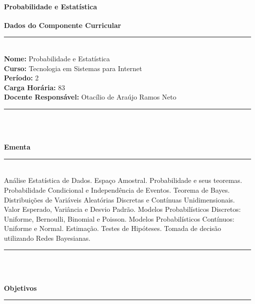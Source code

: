 \paragraph{Probabilidade e Estatística}

\begin{center}\textbf{Dados do Componente Curricular}\end{center}
\vspace{-5mm}
\noindent\rule{16.5cm}{0.4pt}
\\
\textbf{Nome:} Probabilidade e Estatística
\\ 
\textbf{Curso:} Tecnologia em Sistemas para Internet
\\ 
\textbf{Período:} \unit{2}{\degree}
\\ 
\textbf{Carga Horária:} \unit{83}{\hour}
\\ 
\textbf{Docente Responsável:} Otacílio de Araújo Ramos Neto
\\ 
\noindent\rule{16.5cm}{0.4pt}\\
\\
\vspace{-12mm}
\begin{center}\textbf{Ementa}\end{center}
\vspace{-5mm}
\noindent\rule{16.5cm}{0.4pt}
\\
Análise Estatística de Dados. Espaço Amostral. Probabilidade e seus teoremas. Probabilidade Condicional e Independência de Eventos. Teorema de Bayes. Distribuições de Variáveis Aleatórias Discretas e Contínuas Unidimensionais. Valor Esperado, Variância e Desvio Padrão. Modelos Probabilísticos Discretos: Uniforme, Bernoulli, Binomial e Poisson. Modelos Probabilísticos Contínuos: Uniforme e Normal. Estimação. Testes de Hipóteses. Tomada de decisão utilizando Redes Bayesianas.\\
\noindent\rule{16.5cm}{0.4pt}\\
\\
\vspace{-12mm}
\begin{center}\textbf{Objetivos}\end{center}
\vspace{-5mm}
\noindent\rule{16.5cm}{0.4pt}
\\
